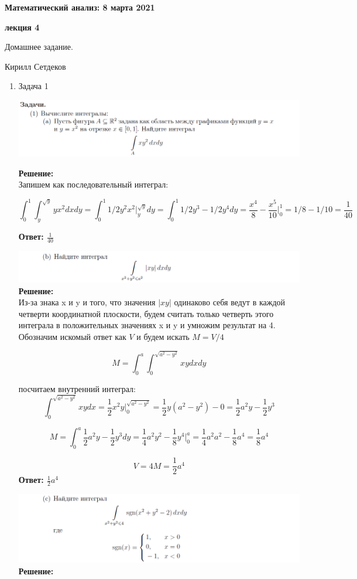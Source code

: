 \documentclass[a4paper,12pt]{article}
\newcounter{z}
\renewcommand{\date}{{\bf 8 марта 2021}}
\newcommand{\HSEhat}{
\vspace*{-0pt}
\noindent
\setcounter{z}{0}


{\bf \phantom{\date}  \large \hfill Математический анализ: \hfill \normalsize \date}

\vspace{5 pt}
{\bf \large \hfill  лекция 4\hfill }

\vspace{15 pt}
\centerline{ \large  Домашнее задание.}
\centerline{ \large  Кирилл Сетдеков}



\vspace*{10pt}
\setcounter{z}{0}

}
\begin{document}
\HSEhat



\begin{enumerate}
\item Задача 1


\includegraphics[width=\textwidth]{img/1a.png}

\textbf{Решение:}\\
Запишем как последовательный интеграл:

$$\int_{0}^{1} \int_{y}^{\sqrt{y}} yx^2 dxdy =\int_{0}^{1}  1/2y^2x^2 \Biggr|_{y}^{\sqrt{y}}  dy  =\int_{0}^{1}  1/2y^3- 1/2y^4  dy =\frac{x^4}{8} - \frac{x^5}{10} \Biggr|_{0}^{1}=1/8-1/10=\frac{1}{40}$$

\textbf{Ответ: $\frac{1}{40}$}

\includegraphics[width=\textwidth]{img/1b.png}
\textbf{Решение:}\\
Из-за знака x и y и того, что значения $|xy|$ одинаково себя ведут в каждой четверти координатной плоскости, будем считать только четверть этого интеграла в положительных значениях x и y и умножим результат на 4. Обозначим искомый ответ как $V$ и будем искать $M=V/4$

$$M = \int_{0}^{a} \int_{0}^{\sqrt{a^2-y^2}} xy dxdy$$

посчитаем внутренний интеграл:
$$\int_{0}^{\sqrt{a^2-y^2}} xy dx = \frac{1}{2}x^2y\Biggr|_{0}^{\sqrt{a^2-y^2}}= \frac{1}{2}y(a^2-y^2)-0= \frac{1}{2}a^2y-\frac{1}{2}y^3$$

$$M = \int_{0}^{a} \frac{1}{2}a^2y-\frac{1}{2}y^3 dy=  \frac{1}{4}a^2y^2-\frac{1}{8}y^4\Biggr|_{0}^{a} = \frac{1}{4}a^2a^2-\frac{1}{8}a^4=\frac{1}{8}a^4$$

$$V=4M = \frac{1}{2}a^4$$
\textbf{Ответ: $\frac{1}{2}a^4$}


\includegraphics[width=\textwidth]{img/1c.png}
\textbf{Решение:}\\


\end{enumerate}
\end{document}
